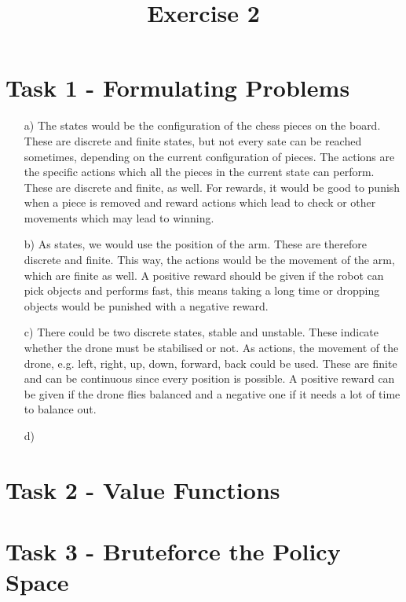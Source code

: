 \documentclass[a4paper]{article}
\date{}
\author{}
\title{\textbf{Exercise 2}}
\begin{document}
\maketitle 
\thispagestyle{fancy}

\section*{Task 1 - Formulating Problems}

\begin{enumerate}
	\item[a)] 
	The states would be the configuration of the chess pieces on the board. 
	These are discrete and finite states, but not every sate can be reached sometimes, depending on the current configuration of pieces.
	The actions are the specific actions which all the pieces in the current state can perform. 
	These are discrete and finite, as well. 
	For rewards, it would be good to punish when a piece is removed and reward actions which lead to check or other movements which may lead to winning.
	\item[b)] 
	As states, we would use the position of the arm. 
	These are therefore discrete and finite.
	This way, the actions would be the movement of the arm, which are finite as well. 
	A positive reward should be given if the robot can pick objects and performs fast, this means taking a long time or dropping objects would be punished with a negative reward. 
	\item[c)] 
	There could be two discrete states, stable and unstable. 
	These indicate whether the drone must be stabilised or not. 
	As actions, the movement of the drone, e.g. left, right, up, down, forward, back could be used. 
	These are finite and can be continuous since every position is possible. 
	A positive reward can be given if the drone flies balanced and a negative one if it needs a lot of time to balance out. 
	\item[d)] 
	
\end{enumerate}

\section*{Task 2 - Value Functions}

\section*{Task 3 - Bruteforce the Policy Space}
\end{document}
